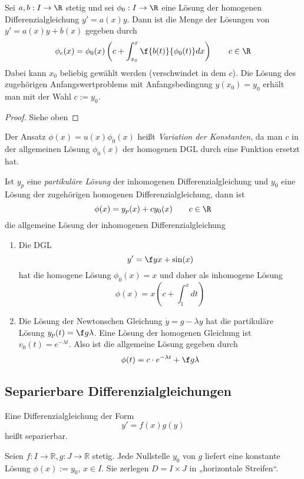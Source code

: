\documentclass[a4paper,10pt]{scrartcl}
\begin{document}
\begin{st}
	Sei $a,b:I \to \R$ stetig und sei $\phi_0 : I \to \R$ eine Lösung der homogenen Differenzialgleichung $y' = a(x) y$.
	Dann ist die Menge der Lösungen von $y' = a(x)y + b(x)$ gegeben durch
	\[
		\phi_c (x) = \phi_0(x) \left(c + \int_{x_0}^x \f {b(t)}{\phi_0(t)} dx\right) \qquad c\in \R
	\]
	Dabei kann $x_0$ beliebig gewählt werden (verschwindet in dem $c$).
	Die Lösung des zugehörigen Anfangswertproblems mit Anfangsbedingung $y(x_0) = y_0$ erhält man mit der Wahl $c := y_0$.
	\begin{proof}
		Siehe oben \fixme[unvollständig]
	\end{proof}
	\begin{note}
		Der Ansatz $\phi(x) = u(x) \phi_0(x)$ heißt \emph{Variation der Konstanten}, da man $c$ in der allgemeinen Lösung $\phi_0(x)$ der homogenen DGL durch eine Funktion ersetzt hat.

		Ist $y_p$ eine \emph{partikuläre Lösung} der inhomogenen Differenzialgleichung und $y_0$ eine Lösung der zugehörigen homogenen Differenzialgleichung, dann ist
		\[
			\phi(x) = y_p(x) + cy_0(x) \qquad c\in \R
		\]
		die allgemeine Lösung der inhomogenen Differenzialgleichung
	\end{note}
\end{st}

\begin{ex*}
	\begin{enumerate}[1)]
		\item
			Die DGL
			\[
				y' = \f yx + \sin(x)
			\]
			hat die homogene Lösung $\phi_0(x) = x$ und daher als inhomogene Lösung
			\[
				\phi(x) = x(c + \int_1^x dt)
			\]
		\item	
			Die Lösung der Newtonschen Gleichung $\dot y = g - \lambda y$ hat die partikuläre Lösung $y_p(t) = \f g\lambda$.
			Eine Lösung der homogenen Gleichung ist $v_0(t) = e^{-\lambda t}$.
			Also ist die allgemeine Lösung gegeben durch
			\[
				\phi(t) = c\cdot e^{-\lambda t} + \f g\lambda
			\]
	\end{enumerate}
\end{ex*}



\subsection{Separierbare Differenzialgleichungen}
Eine Differenzialgleichung der Form 
\[
y'=f(x)g(y)
\]
heißt separierbar.

Seien $f:I\to \mathbb R, g: J\to \mathbb{R}$ stetig.
Jede Nullstelle $y_0$ von $g$ liefert eine konstante Lösung $\phi(x):=y_0$, $x\in I$.
Sie zerlegen $D=I\times J$ in „horizontale Streifen“.
\end{document}
